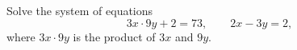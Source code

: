 Solve the system of equations
\[
3x\cdot9y+2=73,\qquad 2x-3y=2,
\]
where $3x\cdot9y$ is the product of $3x$ and $9y$.
